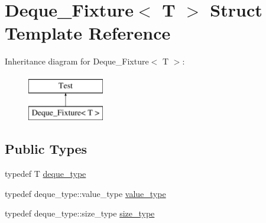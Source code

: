 \hypertarget{structDeque__Fixture}{\section{Deque\-\_\-\-Fixture$<$ T $>$ Struct Template Reference}
\label{structDeque__Fixture}
}
Inheritance diagram for Deque\-\_\-\-Fixture$<$ T $>$\-:\begin{figure}[H]
\begin{center}
\leavevmode
\includegraphics[height=2.000000cm]{structDeque__Fixture}
\end{center}
\end{figure}
\subsection*{Public Types}
\begin{DoxyCompactItemize}
\item 
typedef T \hyperlink{structDeque__Fixture_aff55aebc9f3732e55b5e9afae069a6e7}{deque\-\_\-type}
\item 
typedef deque\-\_\-type\-::value\-\_\-type \hyperlink{structDeque__Fixture_ad3f31d2190bcef2a8809aae173c159e9}{value\-\_\-type}
\item 
typedef deque\-\_\-type\-::size\-\_\-type \hyperlink{structDeque__Fixture_aaf7d8d8eda0003cc8727d9eab7f22086}{size\-\_\-type}
\end{DoxyCompactItemize}


